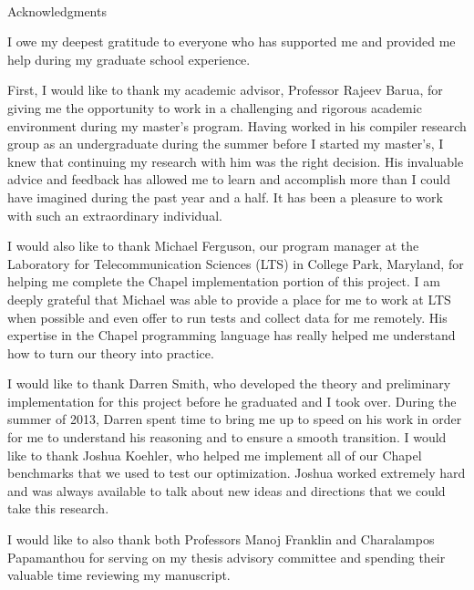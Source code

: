 
\renewcommand{\baselinestretch}{2}
\small\normalsize
\hbox{\ }
 
\vspace{-.65in}

\begin{center}
\large{Acknowledgments} 
\end{center} 

\vspace{1ex}

I owe my deepest gratitude to everyone who has supported me and provided me help during my graduate school experience. 

First, I would like to thank my academic advisor, Professor Rajeev Barua, for giving me the opportunity to work in a challenging and rigorous academic environment during my master's program. Having worked in his compiler research group as an undergraduate during the summer before I started my master's, I knew that continuing my research with him was the right decision. His invaluable advice and feedback has allowed me to learn and accomplish more than I could have imagined during the past year and a half. It has been a pleasure to work with such an extraordinary individual.

I would also like to thank Michael Ferguson, our program manager at the Laboratory for Telecommunication Sciences (LTS) in College Park, Maryland, for helping me complete the Chapel implementation portion of this project. I am deeply grateful that Michael was able to provide a place for me to work at LTS when possible and even offer to run tests and collect data for me remotely. His expertise in the Chapel programming language has really helped me understand how to turn our theory into practice. 

I would like to thank Darren Smith, who developed the theory and preliminary implementation for this project before he graduated and I took over. During the summer of 2013, Darren spent time to bring me up to speed on his work in order for me to understand his reasoning and to ensure a smooth transition. I would like to thank Joshua Koehler, who helped me implement all of our Chapel benchmarks that we used to test our optimization. Joshua worked extremely hard and was always available to talk about new ideas and directions that we could take this research. 

I would like to also thank both Professors Manoj Franklin and Charalampos Papamanthou for serving on my thesis advisory committee and spending their valuable time reviewing my manuscript.

